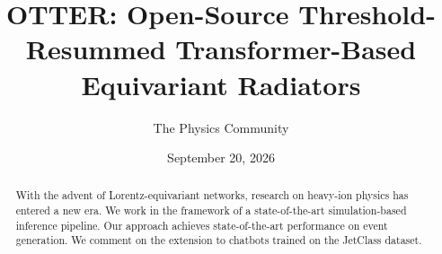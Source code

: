 \documentclass[11pt]{article}
\title{OTTER: Open-Source Threshold-Resummed Transformer-Based Equivariant Radiators}
\author{The Physics Community}
\date{September 20, 2026}
\numberwithin{equation}{section}
\theoremstyle{definition}
\theoremstyle{remark}
\begin{document}
\maketitle
\begin{abstract}
With the advent of Lorentz-equivariant networks, research on heavy-ion
physics has entered a new era. We work in the framework of a
state-of-the-art simulation-based inference pipeline. Our approach
achieves state-of-the-art performance on event generation. We comment on
the extension to chatbots trained on the JetClass dataset.
\end{abstract}
\tableofcontents






\nocite{*}


\end{document}
